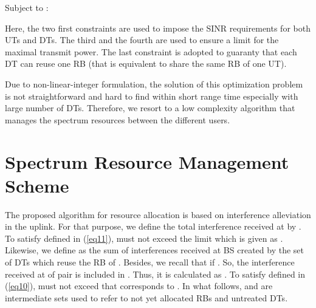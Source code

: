 \documentclass[conference,onecolumn,12pt]{IEEEtran}
\begin{document}
Subject to :





Here, the two first constraints are used to impose the SINR requirements for both UTs and DTs. The third and the fourth are used to ensure a limit for the maximal transmit power. The last constraint is adopted to guaranty that each DT can reuse one RB (that is equivalent to share the same RB of one UT).

Due to non-linear-integer formulation, the solution of this optimization problem is not straightforward and hard to find within short range time especially with large number of DTs. Therefore, we resort to a low complexity algorithm that manages the spectrum resources between the different users.

\section{Spectrum Resource Management Scheme}
The proposed algorithm for resource allocation is based on interference alleviation in the uplink. For that purpose, we define the total interference received at  by . To satisfy  defined in (\ref{eq11}),  must not exceed the limit  which is given as .\\
Likewise, we define  as the sum of interferences received at BS created by the set of DTs which reuse the RB of . Besides, we recall that  if . So, the interference received at  of  pair is included in . Thus, it is calculated as . To satisfy   defined in (\ref{eq10}),  must not exceed  that corresponds to . In what follows,  and  are intermediate sets used to refer to not yet allocated RBs and untreated DTs.
\end{document}

